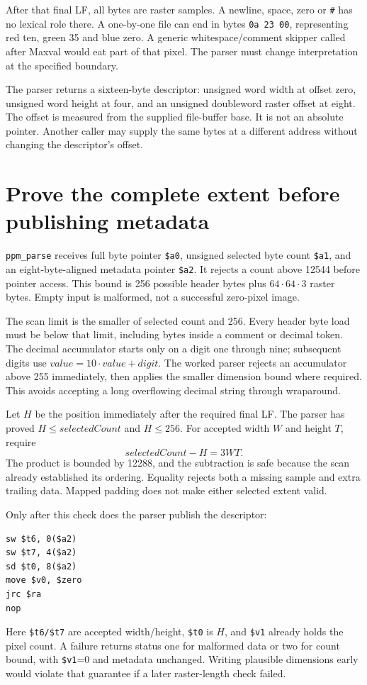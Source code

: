 After that final LF, all bytes are raster samples. A newline, space, zero or
\texttt{\#} has no lexical role there. A one-by-one file can end in bytes
\texttt{0a 23 00}, representing red ten, green 35 and blue zero. A generic
whitespace/comment skipper called after Maxval would eat part of that pixel.
The parser must change interpretation at the specified boundary.

The parser returns a sixteen-byte descriptor: unsigned word width at offset
zero, unsigned word height at four, and an unsigned doubleword raster offset
at eight. The offset is measured from the supplied file-buffer base. It is not
an absolute pointer. Another caller may supply the same bytes at a different
address without changing the descriptor's offset.

\section{Prove the complete extent before publishing metadata}

\texttt{ppm\_parse} receives full byte pointer \texttt{\$a0}, unsigned selected
byte count \texttt{\$a1}, and an eight-byte-aligned metadata pointer
\texttt{\$a2}. It rejects a count above 12544 before pointer access. This bound
is 256 possible header bytes plus $64\cdot64\cdot3$ raster bytes. Empty input
is malformed, not a successful zero-pixel image.

The scan limit is the smaller of selected count and 256. Every header byte load
must be below that limit, including bytes inside a comment or decimal token.
The decimal accumulator starts only on a digit one through nine; subsequent
digits use $\mathit{value}=10\cdot\mathit{value}+\mathit{digit}$. The worked parser rejects an accumulator
above 255 immediately, then applies the smaller dimension bound where required.
This avoids accepting a long overflowing decimal string through wraparound.

Let $H$ be the position immediately after the required final LF. The parser has
proved $H\leq \mathit{selectedCount}$ and $H\leq256$. For accepted width $W$ and height
$T$, require
\[
  \mathit{selectedCount}-H=3WT.
\]
The product is bounded by 12288, and the subtraction is safe because the scan
already established its ordering. Equality rejects both a missing sample and
extra trailing data. Mapped padding does not make either selected extent valid.

Only after this check does the parser publish the descriptor:
\begin{verbatim}
sw $t6, 0($a2)
sw $t7, 4($a2)
sd $t0, 8($a2)
move $v0, $zero
jrc $ra
nop
\end{verbatim}
Here \texttt{\$t6/\$t7} are accepted width/height, \texttt{\$t0} is $H$, and
\texttt{\$v1} already holds the pixel count. A failure returns status one for
malformed data or two for count bound, with \texttt{\$v1}=0 and metadata
unchanged. Writing plausible dimensions early would violate that guarantee if
a later raster-length check failed.


